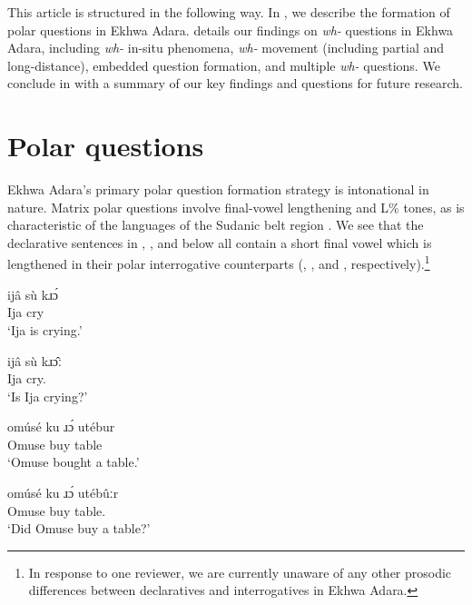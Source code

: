 \documentclass[output=paper,colorlinks,citecolor=brown
]{langscibook}
\begin{document}
This article is structured in the following way. In , we describe the formation of polar questions in Ekhwa Adara.  details our findings on \textit{wh-} questions in Ekhwa Adara, including \textit{wh-} in-situ phenomena, \textit{wh-} movement (including partial and long-distance), embedded question formation, and multiple \textit{wh-} questions. We conclude in  with a summary of our key findings and questions for future research.

\section{Polar questions} \label{sec:matte:2}

Ekhwa Adara’s primary polar question formation strategy is intonational in nature. Matrix polar questions involve final-vowel lengthening and L\% tones, as is characteristic of the languages of the Sudanic belt region \citep{Rialland2007Prosody, Rialland2009, Cahill2012, Cahill2015}. We see that the declarative sentences in , , and  below all contain a short final vowel which is lengthened in their polar interrogative counterparts (, , and , respectively).\footnote{In response to one reviewer, we are currently unaware of any other prosodic differences between declaratives and interrogatives in Ekhwa Adara.}

\ea \label{ex:matte:1}
\begin{xlist}

\ex \label{ex:matte:1a}
\gll ijâ sù kɹɔ́\\
Ija \Prog{} cry\\
\glt `Ija is crying.'

\ex \label{ex:matte:1b}
\gll ijâ sù kɹɔ̂ː\\
Ija \Prog{} cry.\Q{}\\
\glt `Is Ija crying?'

\end{xlist}
\z

\ea \label{ex:matte:2}
\begin{xlist}

\ex \label{ex:matte:2a}
\gll omúsé ku ɹɔ́ utébur\\
Omuse \Pfv{} buy table\\
\glt `Omuse bought a table.'

\ex \label{ex:matte:2b}
\gll omúsé ku ɹɔ́ utébûːr\\
Omuse \Pfv{} buy table.\Q{}\\
\glt `Did Omuse buy a table?'

\end{xlist}
\z
\end{document}
